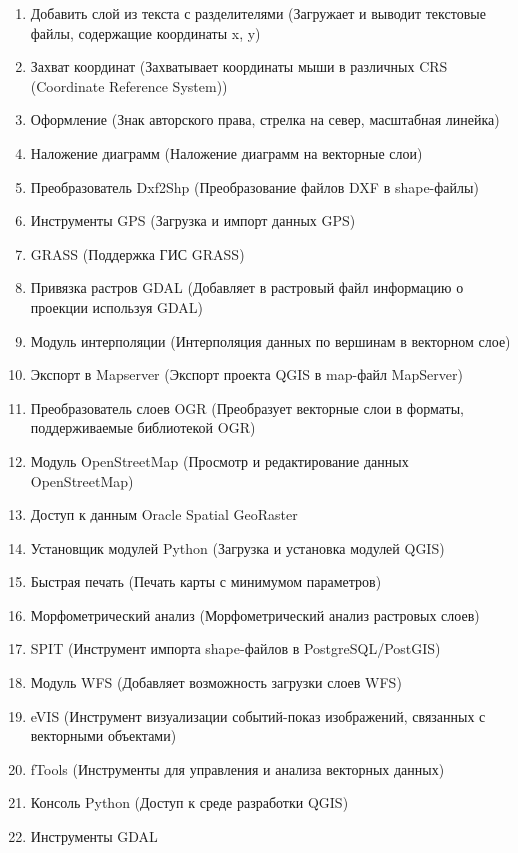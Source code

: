 \begin{enumerate}
\item Добавить слой из текста с разделителями (Загружает и выводит
текстовые файлы, содержащие координаты x, y)
\item Захват координат (Захватывает координаты мыши в различных CRS
(Coordinate Reference System))
\item Оформление (Знак авторского права, стрелка на север, масштабная
линейка)
\item Наложение диаграмм (Наложение диаграмм на векторные слои)
\item Преобразователь Dxf2Shp (Преобразование файлов DXF в shape-файлы)
\item Инструменты GPS (Загрузка и импорт данных GPS)
\item GRASS (Поддержка ГИС GRASS)
\item Привязка растров GDAL (Добавляет в растровый файл информацию о
проекции используя GDAL)
\item Модуль интерполяции (Интерполяция данных по вершинам в векторном
слое)
\item Экспорт в Mapserver (Экспорт проекта QGIS в map-файл MapServer)
\item Преобразователь слоев OGR (Преобразует векторные слои в форматы,
поддерживаемые библиотекой OGR)
\item Модуль OpenStreetMap (Просмотр и редактирование данных
OpenStreetMap)
\item Доступ к данным Oracle Spatial GeoRaster
\item Установщик модулей Python (Загрузка и установка модулей QGIS)
\item Быстрая печать (Печать карты с минимумом параметров)
\item Морфометрический анализ (Морфометрический анализ растровых слоев)
\item SPIT (Инструмент импорта shape-файлов в PostgreSQL/PostGIS)
\item Модуль WFS (Добавляет возможность загрузки слоев WFS)
\item eVIS (Инструмент визуализации событий-показ изображений, связанных
с векторными объектами)
\item fTools (Инструменты для управления и анализа векторных данных)
\item Консоль Python (Доступ к среде разработки QGIS)
\item Инструменты GDAL
\end{enumerate}


